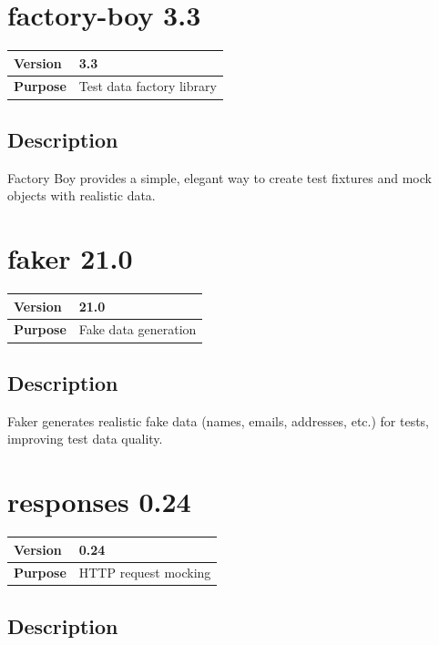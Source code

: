 \documentclass[12pt,a4paper]{report}
\begin{document}
\section{factory-boy 3.3}

\begin{tabular}{|p{4cm}|p{10cm}|}
\hline
\textbf{Version} & 3.3 \\
\hline
\textbf{Purpose} & Test data factory library \\
\hline
\end{tabular}

\subsection{Description}

Factory Boy provides a simple, elegant way to create test fixtures and mock objects with realistic data.

\section{faker 21.0}

\begin{tabular}{|p{4cm}|p{10cm}|}
\hline
\textbf{Version} & 21.0 \\
\hline
\textbf{Purpose} & Fake data generation \\
\hline
\end{tabular}

\subsection{Description}

Faker generates realistic fake data (names, emails, addresses, etc.) for tests, improving test data quality.

\section{responses 0.24}

\begin{tabular}{|p{4cm}|p{10cm}|}
\hline
\textbf{Version} & 0.24 \\
\hline
\textbf{Purpose} & HTTP request mocking \\
\hline
\end{tabular}

\subsection{Description}
\end{document}
